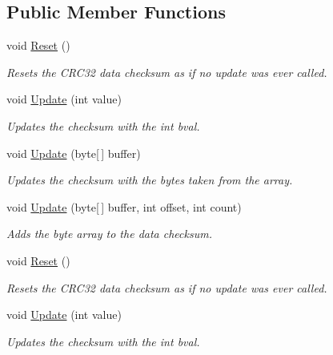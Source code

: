 \subsection*{Public Member Functions}
\begin{DoxyCompactItemize}
\item 
void \hyperlink{class_i_c_sharp_code_1_1_sharp_zip_lib_1_1_checksums_1_1_crc32_a6d0a7a926c3b6f8aea03897a2dc40b07}{Reset} ()
\begin{DoxyCompactList}\small\item\em Resets the C\+R\+C32 data checksum as if no update was ever called. \end{DoxyCompactList}\item 
void \hyperlink{class_i_c_sharp_code_1_1_sharp_zip_lib_1_1_checksums_1_1_crc32_a7f5626219875b0291d1f54e5a7bdbeaa}{Update} (int value)
\begin{DoxyCompactList}\small\item\em Updates the checksum with the int bval. \end{DoxyCompactList}\item 
void \hyperlink{class_i_c_sharp_code_1_1_sharp_zip_lib_1_1_checksums_1_1_crc32_aed937de570263627f41641aea63e399f}{Update} (byte\mbox{[}$\,$\mbox{]} buffer)
\begin{DoxyCompactList}\small\item\em Updates the checksum with the bytes taken from the array. \end{DoxyCompactList}\item 
void \hyperlink{class_i_c_sharp_code_1_1_sharp_zip_lib_1_1_checksums_1_1_crc32_ae980cf50bb530eab0e0d031d1771e7f9}{Update} (byte\mbox{[}$\,$\mbox{]} buffer, int offset, int count)
\begin{DoxyCompactList}\small\item\em Adds the byte array to the data checksum. \end{DoxyCompactList}\item 
void \hyperlink{class_i_c_sharp_code_1_1_sharp_zip_lib_1_1_checksums_1_1_crc32_a6d0a7a926c3b6f8aea03897a2dc40b07}{Reset} ()
\begin{DoxyCompactList}\small\item\em Resets the C\+R\+C32 data checksum as if no update was ever called. \end{DoxyCompactList}\item 
void \hyperlink{class_i_c_sharp_code_1_1_sharp_zip_lib_1_1_checksums_1_1_crc32_a7f5626219875b0291d1f54e5a7bdbeaa}{Update} (int value)
\begin{DoxyCompactList}\small\item\em Updates the checksum with the int bval. \end{DoxyCompactList}\item 

\end{DoxyCompactItemize}
